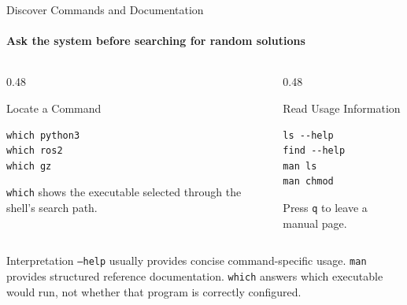 \begin{frame}[fragile]{Discover Commands and Documentation}
\framesubtitle{Ask the system before searching for random solutions}

\scriptsize

\begin{columns}[T,onlytextwidth]
    \begin{column}{0.48\textwidth}
        \begin{block}{Locate a Command}
\begin{verbatim}
which python3
which ros2
which gz
\end{verbatim}
\texttt{which} shows the executable selected through the shell's search path.
        \end{block}
    \end{column}

    \begin{column}{0.48\textwidth}
        \begin{exampleblock}{Read Usage Information}
\begin{verbatim}
ls --help
find --help
man ls
man chmod
\end{verbatim}
Press \texttt{q} to leave a manual page.
        \end{exampleblock}
    \end{column}
\end{columns}

\begin{alertblock}{Interpretation}
\texttt{--help} usually provides concise command-specific usage. \texttt{man}
provides structured reference documentation. \texttt{which} answers which
executable would run, not whether that program is correctly configured.
\end{alertblock}
\end{frame}


